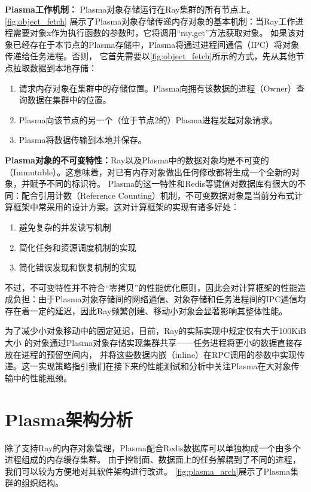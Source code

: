 \textbf{Plasma工作机制：}
Plasma对象存储运行在Ray集群的所有节点上。\autoref{fig:object_fetch}\cite{ray_whitepaper}
展示了Plasma对象存储传递内存对象的基本机制：当Ray工作进程需要对象x作为执行函数的参数时，它将调用“ray.get”方法获取对象。
如果该对象已经存在于本节点的Plasma存储中，Plasma将通过进程间通信（IPC）将对象传递给任务进程。否则，
它首先需要以\autoref{fig:object_fetch}所示的方式，先从其他节点拉取数据到本地存储：

\begin{enumerate}
    \item 请求内存对象在集群中的存储位置。Plasma向拥有该数据的进程（Owner）查询数据在集群中的位置。
    \item Plasma向该节点的另一个（位于节点2的）Plasma进程发起对象请求。
    \item Plasma将数据传输到本地并保存。
\end{enumerate}

\textbf{Plasma对象的不可变特性：}Ray以及Plasma中的数据对象均是不可变的（Immutable）。这意味着，对已有内存对象做出任何修改都将生成一个全新的对象，并赋予不同的标识符。
Plasma的这一特性和Redis等键值对数据库有很大的不同：配合引用计数（Reference Counting）机制，不可变数据对象是当前分布式计算框架中常采用的设计方案。这对计算框架的实现有诸多好处：

\begin{enumerate}
    \item 避免复杂的并发读写机制
    \item 简化任务和资源调度机制的实现
    \item 简化错误发现和恢复机制的实现
\end{enumerate}

不过，不可变特性并不符合“零拷贝”的性能优化原则，因此会对计算框架的性能造成负担：由于Plasma对象存储间的网络通信、对象存储和任务进程间的IPC通信均存在着一定的延迟，因此Ray频繁创建、移动小对象会显著影响其整体性能。

为了减少小对象移动中的固定延迟，目前，Ray的实际实现中规定仅有大于100KiB大小
\cite{ray_whitepaper}的对象通过Plasma对象存储实现集群共享——任务进程将更小的数据直接存放在进程的预留空间内，
并将这些数据内嵌（inline）在RPC调用的参数中实现传递。这一实现策略指引我们在接下来的性能测试和分析中关注Plasma在大对象传输中的性能瓶颈。

\section{Plasma架构分析}
\label{sec:plasma_arch}

除了支持Ray的内存对象管理，Plasma配合Redis数据库可以单独构成一个由多个进程组成的内存缓存集群。
由于控制面、数据面上的任务解耦到了不同的进程，我们可以较为方便地对其软件架构进行改进。
\autoref{fig:plasma_arch}展示了Plasma集群的组织结构。

